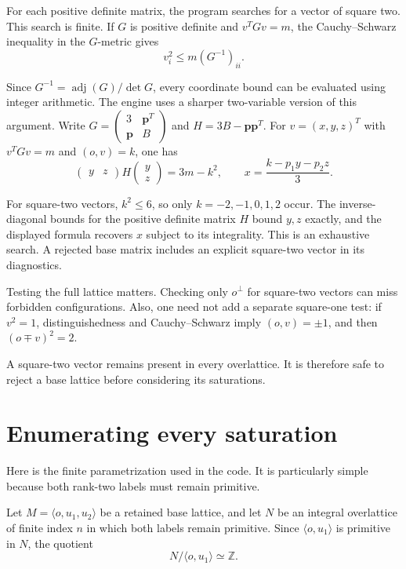 \documentclass[
  american,
  11pt,
  a4paper,
]{article}
\begin{document}
For each positive definite matrix, the program searches for a vector of
square two. This search is finite. If \(G\) is positive definite and
\(v^TGv=m\), the Cauchy--Schwarz inequality in the \(G\)-metric gives
\[v_i^2\le m(G^{-1})_{ii}.\]

Since \(G^{-1}=\operatorname{adj}(G)/\det G\), every coordinate bound
can be evaluated using integer arithmetic. The engine uses a sharper
two-variable version of this argument. Write
\(G=\left(\begin{smallmatrix}3&\mathbf p^T\\\mathbf p&B\end{smallmatrix}\right)\)
and \(H=3B-\mathbf p\mathbf p^T\). For \(v=(x,y,z)^T\) with \(v^TGv=m\)
and \((o,v)=k\), one has
\[
\begin{pmatrix}y&z\end{pmatrix}H\begin{pmatrix}y\\z\end{pmatrix}=3m-k^2,
\qquad x=\frac{k-p_1y-p_2z}{3}.
\]

For square-two vectors, \(k^2\le6\), so only \(k=-2,-1,0,1,2\) occur.
The inverse-diagonal bounds for the positive definite matrix \(H\) bound
\(y,z\) exactly, and the displayed formula recovers \(x\) subject to its
integrality. This is an exhaustive search. A rejected base matrix
includes an explicit square-two vector in its diagnostics.

Testing the full lattice matters. Checking only \(o^\perp\) for
square-two vectors can miss forbidden configurations. Also, one need not
add a separate square-one test: if \(v^2=1\), distinguishedness and
Cauchy--Schwarz imply \((o,v)=\pm1\), and then \((o\mp v)^2=2\).

A square-two vector remains present in every overlattice. It is
therefore safe to reject a base lattice before considering its
saturations.

\section{Enumerating every
saturation}\label{enumerating-every-saturation}

Here is the finite parametrization used in the code. It is particularly
simple because both rank-two labels must remain primitive.

Let \(M=\langle o,u_1,u_2\rangle\) be a retained base lattice, and let
\(N\) be an integral overlattice of finite index \(n\) in which both
labels remain primitive. Since \(\langle o,u_1\rangle\) is primitive in
\(N\), the quotient
\[N/\langle o,u_1\rangle\simeq\mathbb Z.\]
\end{document}

